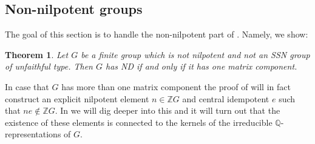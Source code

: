 \documentclass[a4paper,10pt]{amsart}
\newtheorem{theorem}[lemma]{Theorem}
\theoremstyle{definition}
\theoremstyle{remark}
\newcommand{\Z}{{\mathbb Z}}
\newcommand{\Q}{{\mathbb Q}}
\begin{document}
\subsection{Non-nilpotent groups}

The goal of this section is to handle the non-nilpotent part of . Namely, we show:

\begin{theorem}\label{ND for non-nilp SSN grps}
Let $G$ be a finite group which is not nilpotent and not an SSN group of unfaithful type. Then $G$ has ND if and only if it has one matrix component.
\end{theorem}

In case that $G$ has more than one matrix component the proof of  will in fact construct an explicit nilpotent element $n\in \Z G$ and central idempotent $e$ such that $ne \notin \Z G$. In  we will dig deeper into this and it will turn out that the existence of these elements is connected to the kernels of the irreducible $\Q$-representations of $G$.
\end{document}
